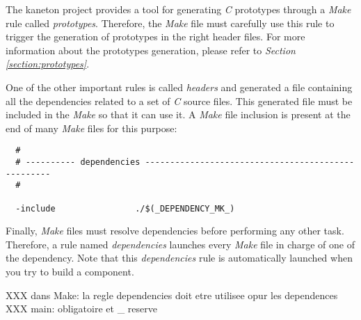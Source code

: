 The kaneton project provides a tool for generating \textit{C} prototypes
through a \textit{Make} rule called \textit{prototypes}. Therefore, the
\textit{Make} file must carefully use this rule to trigger the generation
of prototypes in the right header files. For more information about the
prototypes generation, please refer to \textit{Section
\ref{section:prototypes}}.

One of the other important rules is called \textit{headers} and generated
a file containing all the dependencies related to a set of \textit{C}
source files. This generated file must be included in the \textit{Make}
so that it can use it. A \textit{Make} file inclusion is present at the
end of many \textit{Make} files for this purpose:

\begin{verbatim}
  #
  # ---------- dependencies ---------------------------------------------------
  #

  -include                ./$(_DEPENDENCY_MK_)
\end{verbatim}

Finally, \textit{Make} files must resolve dependencies before performing
any other task. Therefore, a rule named \textit{dependencies} launches
every \textit{Make} file in charge of one of the dependency. Note that this
\textit{dependencies} rule is automatically launched when you try to
build a component.


XXX dans Make: la regle dependencies doit etre utilisee opur les dependences
XXX main: obligatoire et _ reserve

